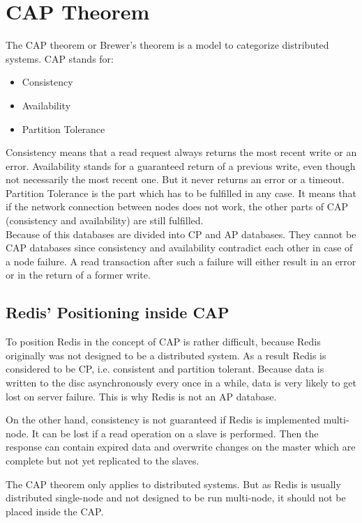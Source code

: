 \section {CAP Theorem}\label{CAP}
The CAP theorem or Brewer's theorem is a model to categorize distributed systems.
CAP stands for:
\begin{itemize}
	\item Consistency
	\item Availability
	\item Partition Tolerance
\end{itemize}
Consistency means that a read request always returns the most recent write or an error.
Availability stands for a guaranteed return of a previous write, even though not necessarily the most recent one. But it never returns an error or a timeout.
Partition Tolerance is the part which has to be fulfilled in any case. It means that if the network connection between nodes does not work, the other parts of CAP (consistency and availability) are still fulfilled.\cite{Messinger}\\
Because of this databases are divided into CP and AP databases. They cannot be CAP databases since consistency and availability contradict each other in case of a node failure. A read transaction after such a failure will either result in an error or in the return of a former write.\cite{Greiner}
\subsection{Redis' Positioning inside CAP}
To position Redis in the concept of CAP is rather difficult, because Redis originally was not designed to be a distributed system. As a result Redis is considered to be CP, i.e. consistent and partition tolerant.
Because data is written to the disc asynchronously every once in a while, data is very likely to get lost on server failure. This is why Redis is not an AP database.

On the other hand, consistency is not guaranteed if Redis is implemented multi-node. It can be lost if a read operation on a slave is performed. Then the response can contain expired data and overwrite changes on the master which are complete but not yet replicated to the slaves.\cite{Jepsen}

The CAP theorem only applies to distributed systems. But as Redis is usually distributed single-node and not designed to be run multi-node, it should not be placed inside the CAP.\cite{Quora}